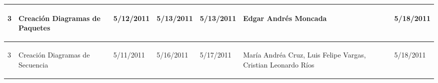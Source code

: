 \begin{center}
\begin{longtable}{|p{}|p{}|p{}|p{}|p{}|p{}|p{}|p{}|}
{\begin{center} 3 \end{center}} & 
{\begin{center} Creación Diagramas de Paquetes \end{center}} & 
{\begin{center} 5/12/2011 \end{center}} & 
{\begin{center} 5/13/2011 \end{center}} & 
{\begin{center} 5/13/2011 \end{center}} & 
{\begin{center} Edgar Andrés Moncada \end{center}} & 
{\begin{center}  \end{center}} & 
{\begin{center} 5/18/2011 \end{center}}\\
\hline

{\begin{center} 3 \end{center}} & 
{\begin{center} Creación Diagramas de Secuencia\end{center}} & 
{\begin{center} 5/11/2011 \end{center}} & 
{\begin{center} 5/16/2011 \end{center}} & 
{\begin{center} 5/17/2011 \end{center}} & 
{\begin{center} María Andréa Cruz, Luis Felipe Vargas, Cristian Leonardo Ríos \end{center}} & 
{\begin{center}  \end{center}} & 
{\begin{center} 5/18/2011 \end{center}}\\
\hline


\end{longtable}
\end{center}
